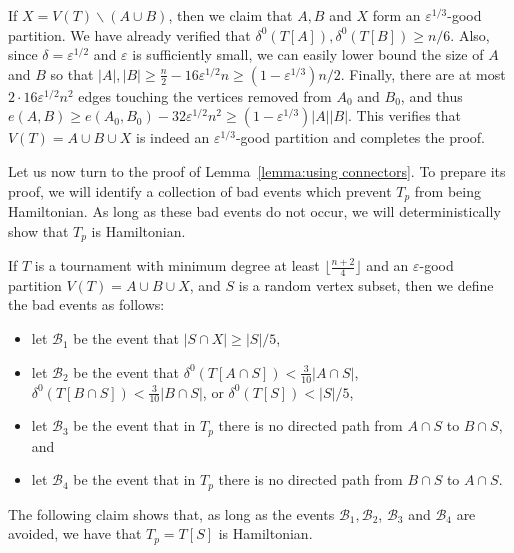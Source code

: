 \documentclass[a4paper,11pt]{article}
\makeatletter
\renewenvironment{proof}[1][\proofname] {\par\pushQED{\qed}\normalfont\topsep6\p@\@plus6\p@\relax\trivlist\item[\hskip\labelsep\textit{#1}\@addpunct{.}]\ignorespaces}{\popQED\endtrivlist\@endpefalse}
\theoremstyle{definition}
\def\eps{\varepsilon}
\def\cB{\mathcal{B}}
\makeatother
\begin{document}
\begin{proof}[Proof of Lemma~\ref{lemma:good partitions exist}.]
If $X=V(T)\backslash (A\cup B)$, then we claim that $A, B$ and $X$ form an $\eps^{1/3}$-good partition. We have already verified that $\delta^0(T[A]), \delta^0(T[B])\geq n/6$. Also, since $\delta=\eps^{1/2}$ and $\eps$ is sufficiently small, we can easily lower bound the size of $A$ and $B$ so that $|A|, |B|\geq \frac{n}{2}-16\eps^{1/2}n\geq (1-\eps^{1/3})n/2$. Finally, there are at most $2\cdot 16 \eps^{1/2} n^2$ edges touching the vertices removed from $A_0$ and $B_0$, and thus $e(A, B)\geq e(A_0, B_0)-32\eps^{1/2}n^2\geq (1-\eps^{1/3})|A||B|$. This verifies that $V(T)=A\cup B\cup X$ is indeed an $\eps^{1/3}$-good partition and completes the proof. 
\end{proof}

Let us now turn to the proof of Lemma~\ref{lemma:using connectors}. To prepare its proof, we will identify a collection of bad events which prevent $T_p$ from being Hamiltonian. As long as these bad events do not occur, we will deterministically show that $T_p$ is Hamiltonian.

If $T$ is a tournament with minimum degree at least $\lfloor \frac{n+2}{4}\rfloor$ and an $\eps$-good partition $V(T)=A\cup B\cup X$, and $S$ is a random vertex subset, then we define the bad events as follows:
\begin{itemize}
    \item let $\cB_1$ be the event that $|S\cap X|\geq |S|/5$,
    \item let $\cB_2$ be the event that $\delta^0(T[A\cap S])< \frac{3}{10}|A\cap S|$, $\delta^0(T[B\cap S])< \frac{3}{10}|B\cap S|$, or $\delta^0(T[S])< |S|/5$,
    \item let $\cB_3$ be the event that in $T_p$ there is no directed path from $A\cap S$ to $B\cap S$, and
    \item let $\cB_4$ be the event that in $T_p$ there is no directed path from $B\cap S$ to $A\cap S$.
\end{itemize}

The following claim shows that, as long as the events $\cB_1, \cB_2$, $\cB_3$ and $\cB_4$ are avoided, we have that $T_p=T[S]$ is Hamiltonian.
\end{document}
